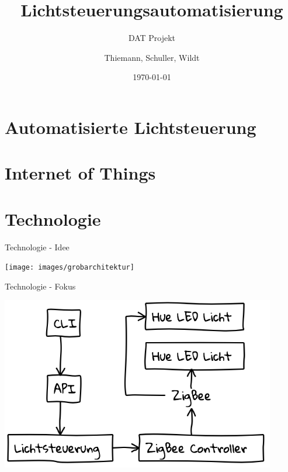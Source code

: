 \documentclass[10pt, compress]{beamer}
\title{Lichtsteuerungsautomatisierung}
\subtitle{DAT Projekt}
\date{\today}
\author{Thiemann, Schuller, Wildt}
\institute{Hochschule Rosenheim}
\begin{document}
\maketitle

\section{Automatisierte Lichtsteuerung}


\section{Internet of Things}

\section{Technologie}

\begin{frame}{Technologie - Idee}
  \begin{center}
    \texttt{[image: images/grobarchitektur]}
  \end{center}
\end{frame}

\begin{frame}{Technologie - Fokus}
  \begin{center}
    \includegraphics[width=0.9\textwidth]{images/realworld}
  \end{center}
\end{frame}
\end{document}
